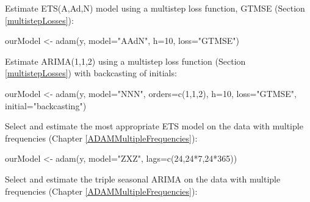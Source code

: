 \documentclass[
]{book}
\newenvironment{Shaded}{\begin{snugshade}}{\end{snugshade}}
\newcommand{\AttributeTok}[1]{\textcolor[rgb]{0.77,0.63,0.00}{#1}}
\newcommand{\DecValTok}[1]{\textcolor[rgb]{0.00,0.00,0.81}{#1}}
\newcommand{\FunctionTok}[1]{\textcolor[rgb]{0.00,0.00,0.00}{#1}}
\newcommand{\NormalTok}[1]{#1}
\newcommand{\OtherTok}[1]{\textcolor[rgb]{0.56,0.35,0.01}{#1}}
\newcommand{\SpecialCharTok}[1]{\textcolor[rgb]{0.00,0.00,0.00}{#1}}
\newcommand{\StringTok}[1]{\textcolor[rgb]{0.31,0.60,0.02}{#1}}
\theoremstyle{definition}
\theoremstyle{definition}
\theoremstyle{definition}
\theoremstyle{definition}
\theoremstyle{remark}
\begin{document}
Estimate ETS(A,Ad,N) model using a multistep loss function, GTMSE (Section \ref{multistepLosses}):

\begin{Shaded}
\begin{Highlighting}[]
\NormalTok{ourModel }\OtherTok{\textless{}{-}} \FunctionTok{adam}\NormalTok{(y, }\AttributeTok{model=}\StringTok{"AAdN"}\NormalTok{,}
                 \AttributeTok{h=}\DecValTok{10}\NormalTok{, }\AttributeTok{loss=}\StringTok{"GTMSE"}\NormalTok{)}
\end{Highlighting}
\end{Shaded}

Estimate ARIMA(1,1,2) using a multistep loss function (Section \ref{multistepLosses}) with backcasting of initials:

\begin{Shaded}
\begin{Highlighting}[]
\NormalTok{ourModel }\OtherTok{\textless{}{-}} \FunctionTok{adam}\NormalTok{(y, }\AttributeTok{model=}\StringTok{"NNN"}\NormalTok{, }\AttributeTok{orders=}\FunctionTok{c}\NormalTok{(}\DecValTok{1}\NormalTok{,}\DecValTok{1}\NormalTok{,}\DecValTok{2}\NormalTok{),}
                 \AttributeTok{h=}\DecValTok{10}\NormalTok{, }\AttributeTok{loss=}\StringTok{"GTMSE"}\NormalTok{, }\AttributeTok{initial=}\StringTok{"backcasting"}\NormalTok{)}
\end{Highlighting}
\end{Shaded}

Select and estimate the most appropriate ETS model on the data with multiple frequencies (Chapter \ref{ADAMMultipleFrequencies}):

\begin{Shaded}
\begin{Highlighting}[]
\NormalTok{ourModel }\OtherTok{\textless{}{-}} \FunctionTok{adam}\NormalTok{(y, }\AttributeTok{model=}\StringTok{"ZXZ"}\NormalTok{, }\AttributeTok{lags=}\FunctionTok{c}\NormalTok{(}\DecValTok{24}\NormalTok{,}\DecValTok{24}\SpecialCharTok{*}\DecValTok{7}\NormalTok{,}\DecValTok{24}\SpecialCharTok{*}\DecValTok{365}\NormalTok{))}
\end{Highlighting}
\end{Shaded}

Select and estimate the triple seasonal ARIMA on the data with multiple frequencies (Chapter \ref{ADAMMultipleFrequencies}):
\end{document}
